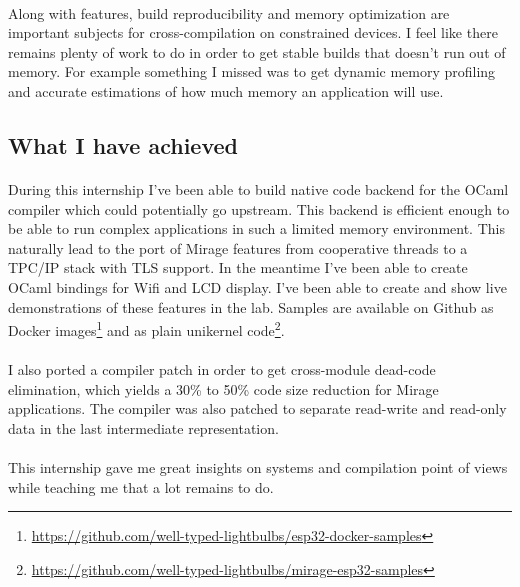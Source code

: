 \documentclass[a4paper]{article}
\begin{document}
\paragraph{}
Along with features, build reproducibility and memory optimization are important subjects for cross-compilation on constrained devices. I feel like there remains plenty of work to do in order to get stable builds that doesn't run out of memory. For example something I missed was to get dynamic memory profiling and accurate estimations of how much memory an application will use. 

\subsection{What I have achieved}
\paragraph{}
During this internship I've been able to build native code backend for the OCaml compiler which could potentially go upstream. This backend is efficient enough to be able to run complex applications in such a limited memory environment. This naturally lead to the port of Mirage features from cooperative threads to a TPC/IP stack with TLS support. In the meantime I've been able to create OCaml bindings for Wifi and LCD display. I've been able to create and show live demonstrations of these features in the lab. Samples are available on Github as Docker images\footnote{\url{https://github.com/well-typed-lightbulbs/esp32-docker-samples}} and as plain unikernel code\footnote{\url{https://github.com/well-typed-lightbulbs/mirage-esp32-samples}}.
\paragraph{}
I also ported a compiler patch in order to get cross-module dead-code elimination, which yields a 30\% to 50\% code size reduction for Mirage applications. The compiler was also patched to separate read-write and read-only data in the last intermediate representation.
\paragraph{}
This internship gave me great insights on systems and compilation point of views while teaching me that a lot remains to do.




\end{document}

